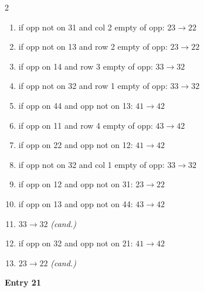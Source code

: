 \begin{multicols}{2}
\begin{tikzpicture}[scale=0.24]
\end{tikzpicture}
\nopagebreak\begin{enumerate}[topsep=1pt,itemsep=0pt,parsep=0pt,leftmargin=2.2em,label=\arabic*.]
\item if opp not on 31 and col 2 empty of opp: $23\!\to\!22$
\item if opp not on 13 and row 2 empty of opp: $23\!\to\!22$
\item if opp on 14 and row 3 empty of opp: $33\!\to\!32$
\item if opp not on 32 and row 1 empty of opp: $33\!\to\!32$
\item if opp on 44 and opp not on 13: $41\!\to\!42$
\item if opp on 11 and row 4 empty of opp: $43\!\to\!42$
\item if opp on 22 and opp not on 12: $41\!\to\!42$
\item if opp not on 32 and col 1 empty of opp: $33\!\to\!32$
\item if opp on 12 and opp not on 31: $23\!\to\!22$
\item if opp on 13 and opp not on 44: $43\!\to\!42$
\item $33\!\to\!32$ \hfill\textit{(cand.)}
\item if opp on 32 and opp not on 21: $41\!\to\!42$
\item $23\!\to\!22$ \hfill\textit{(cand.)}
\end{enumerate}\smallskip
\noindent\textbf{Entry 21} \; 
\end{multicols}
